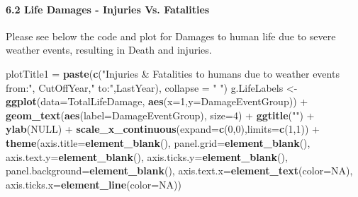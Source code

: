 \documentclass[]{article}
\newenvironment{Shaded}{\begin{snugshade}}{\end{snugshade}}
\newcommand{\KeywordTok}[1]{\textcolor[rgb]{0.13,0.29,0.53}{\textbf{{#1}}}}
\newcommand{\DataTypeTok}[1]{\textcolor[rgb]{0.13,0.29,0.53}{{#1}}}
\newcommand{\DecValTok}[1]{\textcolor[rgb]{0.00,0.00,0.81}{{#1}}}
\newcommand{\StringTok}[1]{\textcolor[rgb]{0.31,0.60,0.02}{{#1}}}
\newcommand{\OtherTok}[1]{\textcolor[rgb]{0.56,0.35,0.01}{{#1}}}
\newcommand{\NormalTok}[1]{{#1}}
\let\oldparagraph\paragraph
\renewcommand{\paragraph}[1]{\oldparagraph{#1}\mbox{}}
\begin{document}
\paragraph{6.2 Life Damages - Injuries Vs.
Fatalities}\label{life-damages---injuries-vs.-fatalities}

Please see below the code and plot for Damages to human life due to
severe weather events, resulting in Death and injuries.

\begin{Shaded}
\begin{Highlighting}[]
\NormalTok{plotTitle1 =}\StringTok{ }\KeywordTok{paste}\NormalTok{(}\KeywordTok{c}\NormalTok{(}\StringTok{"Injuries & Fatalities to humans due to weather events from:"}\NormalTok{,}
                     \NormalTok{CutOffYear,}\StringTok{" to:"}\NormalTok{,LastYear), }
                   \DataTypeTok{collapse =} \StringTok{" "}\NormalTok{)}
\NormalTok{g.LifeLabels <-}\StringTok{ }\KeywordTok{ggplot}\NormalTok{(}\DataTypeTok{data=}\NormalTok{TotalLifeDamage, }
                       \KeywordTok{aes}\NormalTok{(}\DataTypeTok{x=}\DecValTok{1}\NormalTok{,}\DataTypeTok{y=}\NormalTok{DamageEventGroup)) +}
\StringTok{     }\KeywordTok{geom_text}\NormalTok{(}\KeywordTok{aes}\NormalTok{(}\DataTypeTok{label=}\NormalTok{DamageEventGroup), }\DataTypeTok{size=}\DecValTok{4}\NormalTok{) +}
\StringTok{     }\KeywordTok{ggtitle}\NormalTok{(}\StringTok{""}\NormalTok{) +}
\StringTok{     }\KeywordTok{ylab}\NormalTok{(}\OtherTok{NULL}\NormalTok{) +}
\StringTok{     }\KeywordTok{scale_x_continuous}\NormalTok{(}\DataTypeTok{expand=}\KeywordTok{c}\NormalTok{(}\DecValTok{0}\NormalTok{,}\DecValTok{0}\NormalTok{),}\DataTypeTok{limits=}\KeywordTok{c}\NormalTok{(}\DecValTok{1}\NormalTok{,}\DecValTok{1}\NormalTok{)) +}
\StringTok{     }\KeywordTok{theme}\NormalTok{(}\DataTypeTok{axis.title=}\KeywordTok{element_blank}\NormalTok{(),}
           \DataTypeTok{panel.grid=}\KeywordTok{element_blank}\NormalTok{(),}
           \DataTypeTok{axis.text.y=}\KeywordTok{element_blank}\NormalTok{(),}
           \DataTypeTok{axis.ticks.y=}\KeywordTok{element_blank}\NormalTok{(),}
           \DataTypeTok{panel.background=}\KeywordTok{element_blank}\NormalTok{(),}
           \DataTypeTok{axis.text.x=}\KeywordTok{element_text}\NormalTok{(}\DataTypeTok{color=}\OtherTok{NA}\NormalTok{),}
           \DataTypeTok{axis.ticks.x=}\KeywordTok{element_line}\NormalTok{(}\DataTypeTok{color=}\OtherTok{NA}\NormalTok{))}


\end{Highlighting}
\end{Shaded}
\end{document}
